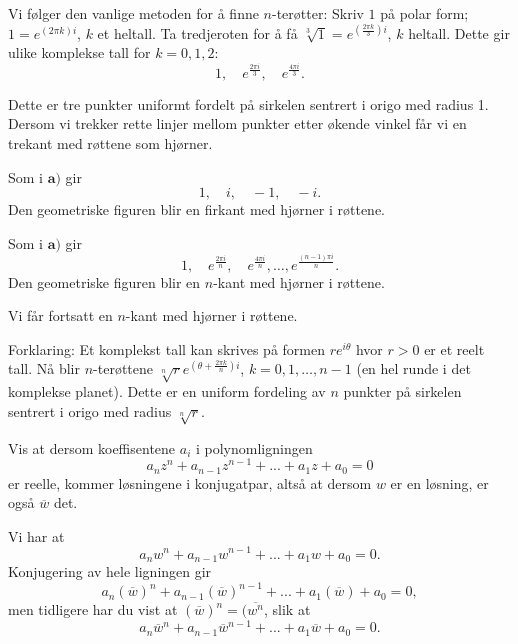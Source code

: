 \begin{losning}

\begin{punkt}
Vi følger den vanlige metoden for å finne $n$-terøtter: Skriv $1$ på polar form; $1=e^{(2\pi k )i}$, $k$ et heltall. Ta tredjeroten for å få $\sqrt[3]{1}=e^{(\frac{2\pi k}{3} )i}$, $k$ heltall. Dette gir ulike komplekse tall for $k=0,1,2$: 
$$1,\quad e^{\frac{2\pi i}{3}}, \quad e^{\frac{4\pi i}{3}}.$$ 

\noindent
Dette er tre punkter uniformt fordelt på sirkelen sentrert i origo med radius 1. Dersom vi trekker rette linjer mellom punkter etter økende vinkel får vi en trekant med røttene som hjørner.
\end{punkt}

\begin{punkt}
Som i $\textbf{a)}$ gir $$1,\quad i,\quad -1, \quad -i. $$ Den geometriske figuren blir en firkant med hjørner i røttene.
\end{punkt}

\begin{punkt}
Som i $\textbf{a)}$ gir $$1,\quad e^{\frac{2\pi i}{n}},\quad e^{\frac{4\pi i}{n}},\dots,e^{\frac{(n-1)\pi i}{n}}.$$ Den geometriske figuren blir en $n$-kant med hjørner i røttene.
\end{punkt}

\begin{punkt}
Vi får fortsatt en $n$-kant med hjørner i røttene.

\noindent
Forklaring: Et komplekst tall kan skrives på formen $re^{i\theta}$ hvor $r>0$ er et reelt tall. Nå blir $n$-terøttene $\sqrt[n]{r}e^{(\theta+\frac{2\pi k}{n})i}$, $k=0,1,\dots, n-1$ (en hel runde i det komplekse planet). Dette er en uniform fordeling av $n$ punkter på sirkelen sentrert i origo med radius $\sqrt[n]{r}$.
\end{punkt}

\end{losning}


\begin{oppgave}
Vis at dersom koeffisentene $a_i$ i polynomligningen
\[
a_nz^n+a_{n-1}z^{n-1}+...+a_1z+a_0=0
\]
er reelle, kommer løsningene i konjugatpar, altså at dersom $w$ er en løsning, er også $\overline w$ det.
\end{oppgave}

\begin{losning}
Vi har at
\[
a_nw^n+a_{n-1}w^{n-1}+...+a_1w+a_0=0.
\]
Konjugering av hele ligningen gir 
\[
a_n(\overline w)^n+a_{n-1}(\overline w)^{n-1}+...+a_1(\overline w)+a_0=0,
\]
men tidligere har du vist at $(\overline w)^n=(\overline {w^n}$, slik at 
\[
a_n\overline w^n+a_{n-1}\overline w^{n-1}+...+a_1\overline w+a_0=0.
\]



\end{losning}



